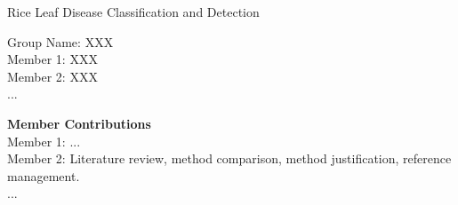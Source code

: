 \documentclass[14pt,a4paper]{extarticle}
\begin{document}
\begin{titlepage}
    \centering
    {\Large Rice Leaf Disease Classification and Detection\\[1cm]}
    
    Group Name: XXX\\
    Member 1: XXX\\
    Member 2: XXX\\
    ...
    
    \vfill
    
    \textbf{Member Contributions}\\
    Member 1: ...\\
    Member 2: Literature review, method comparison, method justification, reference management.\\
    ...
\end{titlepage}

\setcounter{page}{1}






















\appendix


\end{document}
